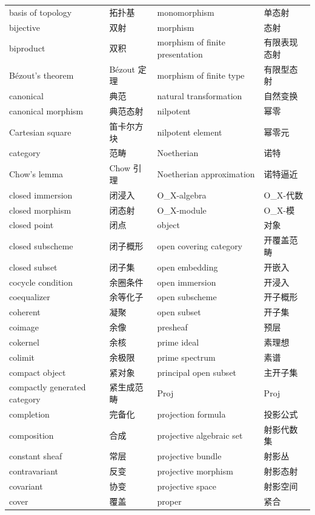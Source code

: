 \begin{longtable}{@{}>{\raggedright\arraybackslash}p{}>{\raggedright\arraybackslash}p{}>{\raggedright\arraybackslash}p{}>{\raggedright\arraybackslash}p{}@{}}
basis of topology & 拓扑基 & monomorphism & 单态射 \\
bijective & 双射 & morphism & 态射 \\
biproduct & 双积 & morphism of finite presentation & 有限表现态射 \\
Bézout's theorem & Bézout 定理 & morphism of finite type & 有限型态射 \\
canonical & 典范 & natural transformation & 自然变换 \\
canonical morphism & 典范态射 & nilpotent & 幂零 \\
Cartesian square & 笛卡尔方块 & nilpotent element & 幂零元 \\
category & 范畴 & Noetherian & 诺特 \\
Chow's lemma & Chow 引理 & Noetherian approximation & 诺特逼近 \\
closed immersion & 闭浸入 & O\_X-algebra & O\_X-代数 \\
closed morphism & 闭态射 & O\_X-module & O\_X-模 \\
closed point & 闭点 & object & 对象 \\
closed subscheme & 闭子概形 & open covering category & 开覆盖范畴 \\
closed subset & 闭子集 & open embedding & 开嵌入 \\
cocycle condition & 余圈条件 & open immersion & 开浸入 \\
coequalizer & 余等化子 & open subscheme & 开子概形 \\
coherent & 凝聚 & open subset & 开子集 \\
coimage & 余像 & presheaf & 预层 \\
cokernel & 余核 & prime ideal & 素理想 \\
colimit & 余极限 & prime spectrum & 素谱 \\
compact object & 紧对象 & principal open subset & 主开子集 \\
compactly generated category & 紧生成范畴 & Proj & Proj \\
completion & 完备化 & projection formula & 投影公式 \\
composition & 合成 & projective algebraic set & 射影代数集 \\
constant sheaf & 常层 & projective bundle & 射影丛 \\
contravariant & 反变 & projective morphism & 射影态射 \\
covariant & 协变 & projective space & 射影空间 \\
cover & 覆盖 & proper & 紧合 \\

\end{longtable}

